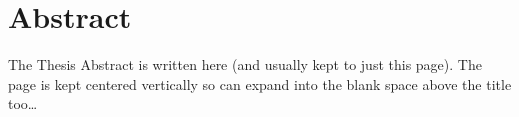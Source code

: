 \chapter{Abstract}

The Thesis Abstract is written here (and usually kept to just this page). The page is kept centered vertically so can expand into the blank space above the title too\ldots

